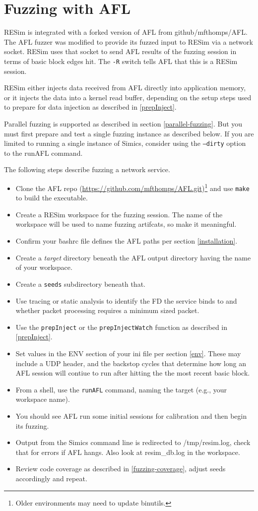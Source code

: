 \documentclass[titlepage]{article}
\begin{document}
\section{Fuzzing with AFL}
\label{fuzz}
RESim is integrated with a forked version of AFL from github/mfthomps/AFL.
The AFL fuzzer was modified to provide its fuzzed input to RESim via a
network socket.  RESim uses that socket to send AFL results of the fuzzing
session in terms of basic block edges hit.  The {\tt -R} switch tells AFL
that this is a RESim session.

RESim either injects data received from AFL directly into application memory, or it injects the data into
a kernel read buffer, depending on the setup steps used to prepare for data injection as described in \ref{prepInject}.

Parallel fuzzing is supported as described in section \ref{parallel-fuzzing}.  But you must first prepare and
test a single fuzzing instance as described below.  If you are limited to running a single instance of Simics, consider using
the {\tt --dirty} option to the runAFL command.

The following steps describe fuzzing a network service.
\begin{itemize}
\item Clone the AFL repo (\url{https://github.com/mfthomps/AFL.git})\footnote{Older environments may need to update binutils.} and use {\tt make} to build the executable.
\item Create a RESim workspace for the fuzzing session.  The name of the workspace will be used
to name fuzzing artifcats, so make it meaningful.
\item Confirm your {\.bashrc} file defines the AFL paths per section \ref{installation}.
\item Create a \textit{target} directory beneath the AFL output directory having the name of your workspace.
\item Create a {\tt seeds} subdirectory beneath that. 
\item Use tracing or static analysis to identify the FD the service binds to and whether packet processing requires a minimum sized packet.
\item Use the {\tt prepInject} or the {\tt prepInjectWatch} function as described in \ref{prepInject}.
\item Set values in the ENV section of your ini file per section \ref{env}.  These may include a UDP header, and the 
backstop cycles that determine how long an AFL session will contiue to run after hitting the the most recent basic block. 
\item From a shell, use the {\tt runAFL} command, naming the target (e.g., your workspace name).
\item You should see AFL run some initial sessions for calibration and then begin its fuzzing.
\item Output from the Simics command line is redirected to /tmp/resim.log, check that for errors if AFL hangs.  Also look at resim\_db.log
in the workspace.
\item Review code coverage as described in \ref{fuzzing-coverage}, adjust seeds accordingly and repeat.
\end{itemize}
\end{document}
